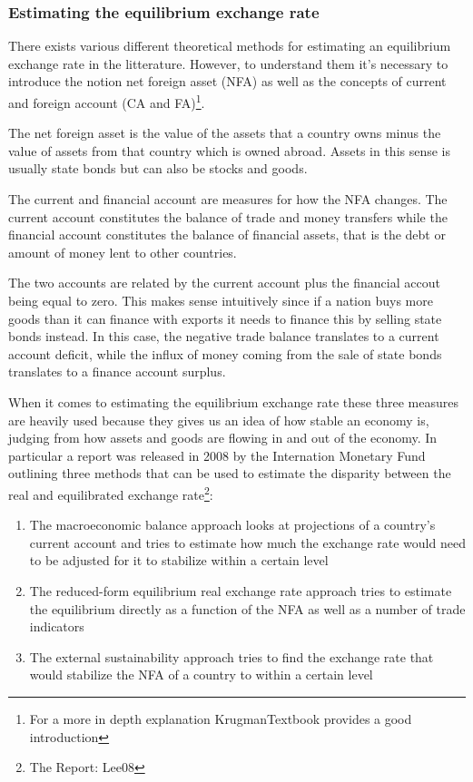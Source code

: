 \documentclass[11pt]{article}
\begin{document}
\subsubsection{Estimating the equilibrium exchange rate}

There exists various different theoretical methods for estimating an 
equilibrium exchange rate in the litterature. However, to understand 
them it's necessary to introduce the notion net foreign asset (NFA) as 
well as the concepts of current and foreign account (CA and 
FA)\footnote{For a more in depth explanation \cite{ch.  
18}{KrugmanTextbook} provides a good introduction}.

The net foreign asset is the value of the assets that a country owns 
minus the value of assets from that country which is owned abroad.  
Assets in this sense is usually state bonds but can also be stocks and 
goods.  

The current and financial account are measures for how the NFA changes.  
The current account constitutes the balance of trade and money transfers 
while the financial account constitutes the balance of financial assets, 
that is the debt or amount of money lent to other countries. 

The two accounts are related by the current account plus the financial 
accout being equal to zero. This makes sense intuitively since if a 
nation buys more goods than it can finance with exports it needs to 
finance this by selling state bonds instead. In this case, the negative 
trade balance translates to a current account deficit, while the influx 
of money coming from the sale of state bonds translates to a finance 
account surplus.

When it comes to estimating the equilibrium exchange rate these three 
measures are heavily used because they gives us an idea of how stable an 
economy is, judging from how assets and goods are flowing in and out of 
the economy. In particular a report was released in 2008 by the 
Internation Monetary Fund outlining three methods that can be used to 
estimate the disparity between the real and equilibrated exchange 
rate\footnote{The Report: \cite{pp.  1}{Lee08}}:

\begin{enumerate}
\item{The macroeconomic balance approach looks at projections of a 
	country's current account and tries to estimate how much the 
exchange rate would need to be adjusted for it to stabilize within a 
certain level}
\item{The reduced-form equilibrium real exchange rate approach tries to 
	estimate the equilibrium directly as a function of the NFA as well 
as a number of trade indicators}
\item{The external sustainability approach tries to find the exchange 
	rate that would stabilize the NFA of a country to within a certain 
level}
\end{enumerate}
\end{document}
